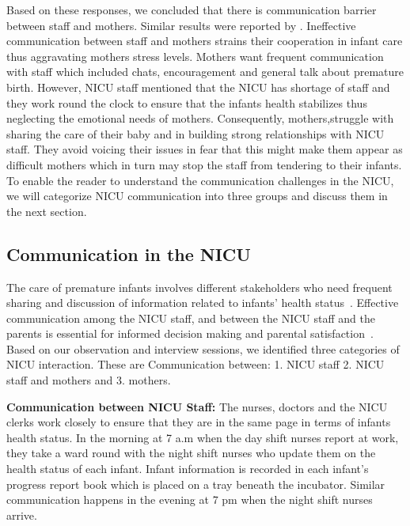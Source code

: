 Based on these responses, we concluded that there is communication barrier between staff and mothers. Similar results were reported by \citep{Mok2006, Aagaard2008}. Ineffective communication between staff and mothers strains their cooperation in infant care thus aggravating mothers stress levels. Mothers want frequent communication with staff which included chats, encouragement and general talk about premature birth. However, NICU staff mentioned that the NICU has shortage of staff and they work round the clock to ensure that the infants health stabilizes thus neglecting the emotional needs of mothers. Consequently, mothers,struggle with sharing the care of their baby and in building strong relationships with NICU staff. They avoid voicing their issues in fear that this might make them appear as difficult mothers which in turn may stop the staff from tendering to their infants. To enable the reader to understand the communication challenges in the NICU, we will categorize NICU communication into three groups and discuss them in the next section.

\subsection{Communication in the NICU}
The care of premature infants involves different stakeholders who need frequent sharing and discussion of information related to infants' health status~\citep{Wigert2014b}. Effective communication among the NICU staff, and between the NICU staff and the parents is essential for informed decision making and parental satisfaction~\citep{Kowalski2006}. Based on our observation and interview sessions, we identified three categories of  NICU interaction. These are Communication between: 1. NICU staff 2. NICU staff and mothers and 3. mothers. 

\textbf{Communication between NICU Staff:}
The nurses, doctors and the NICU clerks work closely to ensure that they are in the same page in terms of infants health status. In the morning at 7 a.m when the day shift nurses report at work, they take a ward round with the night shift nurses who update them on the health status of each infant. Infant information is recorded in each infant's progress report book which is placed on a tray beneath the incubator. Similar communication happens in the evening at 7 pm when the night shift nurses arrive.

